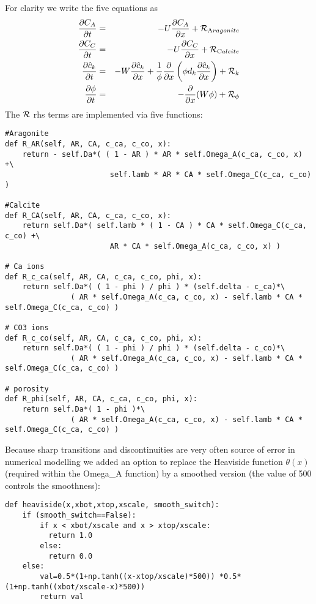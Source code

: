 \documentclass[a4paper]{article}
\newcommand{\nn}{\nonumber}
\newcommand{\python}{\color{darkgray} \sffamily }
\begin{document}
For clarity we write the five equations as
\begin{eqnarray}
\frac{\partial C_A}{\partial t} &=& -U \frac{\partial C_A}{\partial x}  + {\cal R}_{\text Aragonite}
\nn\\
\frac{\partial C_C}{\partial t} &=& -U \frac{\partial C_C}{\partial x}  + {\cal R}_{\text Calcite} 
\nn\\
\frac{\partial \hat{c}_k}{\partial t} &=& -W \frac{\partial \hat{c}_k}{\partial x}
+\frac{1}{\phi} \frac{\partial}{\partial x} \left( \phi d_k \frac{\partial \hat{c}_k}{\partial x} \right)
+{\cal R}_{k}
\nn\\ 
\frac{\partial \phi}{\partial t} &=& -\frac{\partial}{\partial x} (W \phi) +{\cal R}_\phi
\end{eqnarray}
The ${\cal R}$ rhs terms are implemented via five functions:
\begin{lstlisting}
#Aragonite
def R_AR(self, AR, CA, c_ca, c_co, x):
    return - self.Da*( ( 1 - AR ) * AR * self.Omega_A(c_ca, c_co, x) +\
                        self.lamb * AR * CA * self.Omega_C(c_ca, c_co) )

#Calcite
def R_CA(self, AR, CA, c_ca, c_co, x):
    return self.Da*( self.lamb * ( 1 - CA ) * CA * self.Omega_C(c_ca, c_co) +\
                        AR * CA * self.Omega_A(c_ca, c_co, x) )

# Ca ions
def R_c_ca(self, AR, CA, c_ca, c_co, phi, x):
    return self.Da*( ( 1 - phi ) / phi ) * (self.delta - c_ca)*\
               ( AR * self.Omega_A(c_ca, c_co, x) - self.lamb * CA * self.Omega_C(c_ca, c_co) )

# CO3 ions
def R_c_co(self, AR, CA, c_ca, c_co, phi, x):
    return self.Da*( ( 1 - phi ) / phi ) * (self.delta - c_co)*\
               ( AR * self.Omega_A(c_ca, c_co, x) - self.lamb * CA * self.Omega_C(c_ca, c_co) )

# porosity
def R_phi(self, AR, CA, c_ca, c_co, phi, x):
    return self.Da*( 1 - phi )*\
               ( AR * self.Omega_A(c_ca, c_co, x) - self.lamb * CA * self.Omega_C(c_ca, c_co) )
\end{lstlisting}
Because sharp transitions and discontinuities are very often source of error in numerical modelling we added an option to replace the Heaviside function $\theta(x)$ (required within the {\python Omega\_A} function) by a smoothed version (the value of 500 controls the smoothness):
\begin{lstlisting}
def heaviside(x,xbot,xtop,xscale, smooth_switch):
    if (smooth_switch==False):
        if x < xbot/xscale and x > xtop/xscale:
          return 1.0
        else:
          return 0.0
    else:
        val=0.5*(1+np.tanh((x-xtop/xscale)*500)) *0.5*(1+np.tanh((xbot/xscale-x)*500))
        return val
\end{lstlisting}
\end{document}
